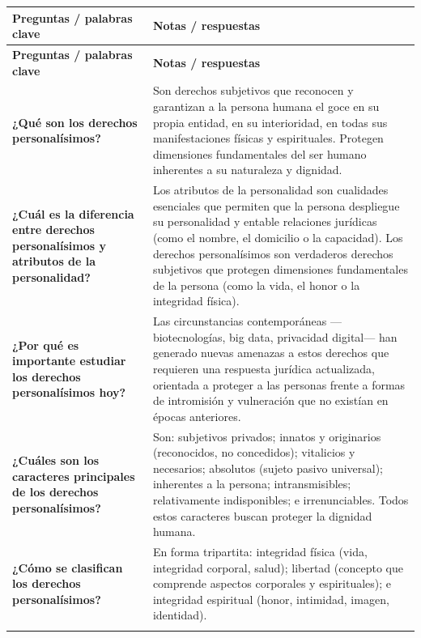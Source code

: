 \documentclass[12pt,oneside]{book}
\begin{document}
\begin{longtable}{
    >{\raggedright\arraybackslash}p{}
    >{\raggedright\arraybackslash}p{}
}
\toprule
\textbf{Preguntas / palabras clave} & \textbf{Notas / respuestas} \\
\midrule
\endfirsthead
\toprule
\textbf{Preguntas / palabras clave} & \textbf{Notas / respuestas} \\
\midrule
\endhead

\textbf{¿Qué son los derechos personalísimos?} &
Son derechos subjetivos que reconocen y garantizan a la persona humana el goce en su propia entidad, en su interioridad, en todas sus manifestaciones físicas y espirituales. Protegen dimensiones fundamentales del ser humano inherentes a su naturaleza y dignidad. \\
\addlinespace

\textbf{¿Cuál es la diferencia entre derechos personalísimos y atributos de la personalidad?} &
Los atributos de la personalidad son cualidades esenciales que permiten que la persona despliegue su personalidad y entable relaciones jurídicas (como el nombre, el domicilio o la capacidad). Los derechos personalísimos son verdaderos derechos subjetivos que protegen dimensiones fundamentales de la persona (como la vida, el honor o la integridad física). \\
\addlinespace

\textbf{¿Por qué es importante estudiar los derechos personalísimos hoy?} &
Las circunstancias contemporáneas —biotecnologías, big data, privacidad digital— han generado nuevas amenazas a estos derechos que requieren una respuesta jurídica actualizada, orientada a proteger a las personas frente a formas de intromisión y vulneración que no existían en épocas anteriores. \\
\addlinespace

\textbf{¿Cuáles son los caracteres principales de los derechos personalísimos?} &
Son: subjetivos privados; innatos y originarios (reconocidos, no concedidos); vitalicios y necesarios; absolutos (sujeto pasivo universal); inherentes a la persona; intransmisibles; relativamente indisponibles; e irrenunciables. Todos estos caracteres buscan proteger la dignidad humana. \\
\addlinespace

\textbf{¿Cómo se clasifican los derechos personalísimos?} &
En forma tripartita: integridad física (vida, integridad corporal, salud); libertad (concepto que comprende aspectos corporales y espirituales); e integridad espiritual (honor, intimidad, imagen, identidad). \\
\addlinespace


\end{longtable}
\end{document}
